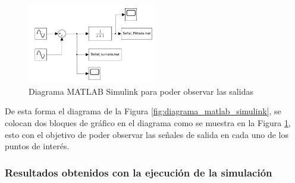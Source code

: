 \begin{figure}[h!]
    \centering
    \includegraphics[width=0.5\textwidth]{fig/especifico_2/CASO_ESTUDIO_FILTRO/Diagrama matlab simulink scope.pdf}
    \caption{Diagrama MATLAB Simulink para poder observar las salidas}
    \label{fig:diagrama_matlab_simulink_graficos}
\end{figure}

De esta forma el diagrama de la Figura \ref{fig:diagrama_matlab_simulink}, se colocan dos bloques de gráfico en el diagrama como se muestra en la Figura \ref{fig:diagrama_matlab_simulink_graficos}, esto con el objetivo de poder observar las señales de salida en cada uno de los puntos de interés.


\newpage

\subsubsection{Resultados obtenidos con la ejecución de la simulación}



